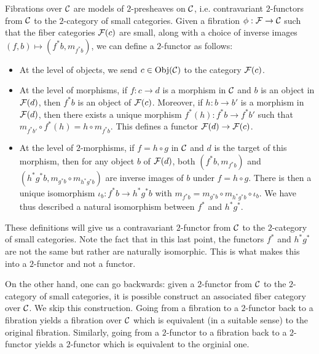 \documentclass{amsart}
\begin{document}
\begin{remark}
    Fibrations over $\mathcal C$ are models of $2$-presheaves on $\mathcal C$, i.e. contravariant $2$-functors
        from $\mathcal C$ to the $2$-category of small categories.
    Given a fibration $\phi:\mathcal F\to \mathcal C$ 
        such that the fiber categories $\mathcal F(c)$ are small, along with a choice of inverse images
        $(f,b)\mapsto (f^\ast b, m_{f^\ast b})$, we can define a $2$-functor as follows:
    \begin{itemize}
        \item At the level of objects, we send $c \in \operatorname{Obj}(\mathcal C)$
            to the category $\mathcal F(c)$.
        \item At the level of morphisms, if $f:c\to d$ is a morphism in $\mathcal C$
                and $b$ is an object in $\mathcal F(d)$, then $f^\ast b$ is an object of $\mathcal F(c)$.
            Moreover, if $h:b\to b'$ is a morphism in $\mathcal F(d)$,
                then there exists a unique morphism $f^\ast(h):f^\ast b\to f^\ast b'$
                such that $m_{f^\ast b'}\circ f^\ast(h)=h\circ m_{f^\ast b}$.
            This defines a functor $\mathcal F(d)\to\mathcal F(c)$.
        \item At the level of $2$-morphisms, if $f=h\circ g$ in $\mathcal C$
                and $d$ is the target of this morphism,
                then for any object $b$ of $\mathcal F(d)$,
                both $(f^\ast b, m_{f^\ast b})$ and 
                $(h^\ast g^\ast b,m_{g^\ast b}\circ m_{h^\ast g^\ast b})$
                are inverse images of $b$ under $f=h\circ g$.
            There is then a unique isomorphism $\iota_b:f^\ast b\to h^\ast g^\ast b$
                with $m_{f^\ast b}= m_{g^\ast b}\circ m_{h^\ast g^\ast b}\circ \iota_b$.
            We have thus described a natural isomorphism between $f^\ast$
                and $h^\ast g^\ast$.
    \end{itemize}
    These definitions will give us a contravariant $2$-functor from $\mathcal C$ to 
        the $2$-category of small categories.
    Note the fact that in this last point, the functors $f^\ast$ and $h^\ast g^\ast$
        are not the same but rather are naturally isomorphic.
    This is what makes this into a $2$-functor and not a functor.

    On the other hand, one can go backwards: given a $2$-functor from $\mathcal C$ to the $2$-category of small categories,
        it is possible construct an associated fiber category over $\mathcal C$.
    We skip this construction.
    Going from a fibration to a $2$-functor back to a fibration yields 
        a fibration over $\mathcal C$ which is equivalent (in a suitable sense)
        to the original fibration.
    Similarly, going from a $2$-functor to a fibration back to a $2$-functor
        yields a $2$-functor which is equivalent to the orginial one.
\end{remark}
\end{document}
